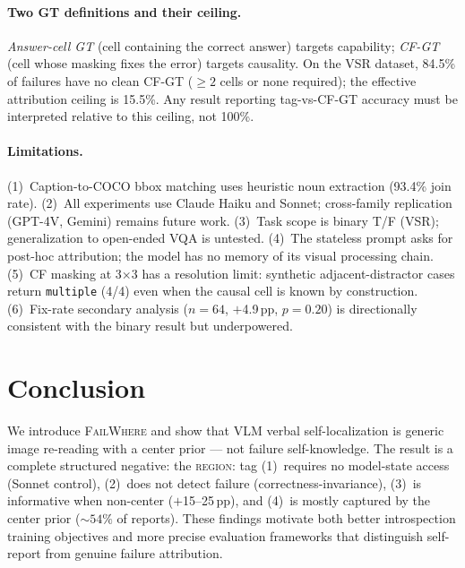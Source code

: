 \documentclass[11pt]{article}
\begin{document}
\paragraph{Two GT definitions and their ceiling.}
\textit{Answer-cell GT} (cell containing the correct answer) targets capability;
\textit{CF-GT} (cell whose masking fixes the error) targets causality.
On the VSR dataset, 84.5\% of failures have no clean CF-GT ($\geq 2$ cells or
none required); the effective attribution ceiling is 15.5\%.
Any result reporting tag-vs-CF-GT accuracy must be interpreted relative to this
ceiling, not 100\%.

\paragraph{Limitations.}
(1)~Caption-to-COCO bbox matching uses heuristic noun extraction (93.4\% join rate).
(2)~All experiments use Claude Haiku and Sonnet; cross-family replication
(GPT-4V, Gemini) remains future work.
(3)~Task scope is binary T/F (VSR); generalization to open-ended VQA is untested.
(4)~The stateless prompt asks for post-hoc attribution; the model has no memory
of its visual processing chain.
(5)~CF masking at 3$\times$3 has a resolution limit: synthetic adjacent-distractor
cases return \texttt{multiple} (4/4) even when the causal cell is known by
construction.
(6)~Fix-rate secondary analysis ($n{=}64$, $+$4.9\,pp, $p{=}0.20$) is
directionally consistent with the binary result but underpowered.


\section{Conclusion}

We introduce \textsc{FailWhere} and show that VLM verbal self-localization is
generic image re-reading with a center prior — not failure self-knowledge.
The result is a complete structured negative: the \textsc{region:} tag
(1)~requires no model-state access (Sonnet control), (2)~does not detect
failure (correctness-invariance), (3)~is informative when non-center
($+$15--25\,pp), and (4)~is mostly captured by the center prior (${\sim}54\%$
of reports).
These findings motivate both better introspection training objectives and
more precise evaluation frameworks that distinguish self-report from genuine
failure attribution.
\end{document}
